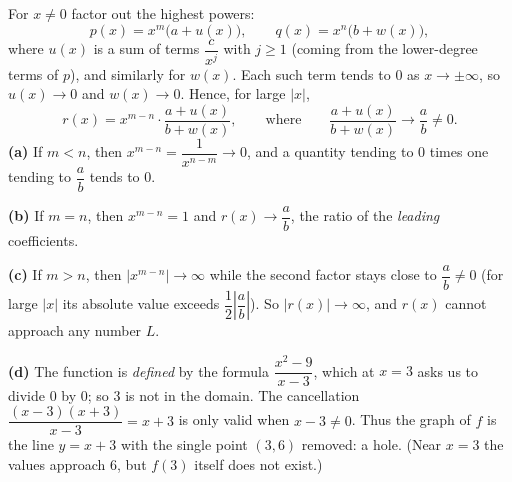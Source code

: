 For $x\ne0$ factor out the highest powers:
\[p(x)=x^m\bigl(a+u(x)\bigr),\qquad q(x)=x^n\bigl(b+w(x)\bigr),\]
where $u(x)$ is a sum of terms $\dfrac{c}{x^j}$ with $j\ge1$ (coming from the lower-degree terms of $p$), and similarly for $w(x)$. Each such term tends to $0$ as $x\to\pm\infty$, so $u(x)\to0$ and $w(x)\to0$. Hence, for large $|x|$,
\[r(x)=x^{m-n}\cdot\dfrac{a+u(x)}{b+w(x)},\qquad\text{where}\qquad\dfrac{a+u(x)}{b+w(x)}\to\dfrac ab\ne0.\]
\textbf{(a)} If $m<n$, then $x^{m-n}=\dfrac1{x^{n-m}}\to0$, and a quantity tending to $0$ times one tending to $\dfrac ab$ tends to $0$.

\textbf{(b)} If $m=n$, then $x^{m-n}=1$ and $r(x)\to\dfrac ab$, the ratio of the \emph{leading} coefficients.

\textbf{(c)} If $m>n$, then $\left|x^{m-n}\right|\to\infty$ while the second factor stays close to $\dfrac ab\ne0$ (for large $|x|$ its absolute value exceeds $\dfrac12\left|\dfrac ab\right|$). So $|r(x)|\to\infty$, and $r(x)$ cannot approach any number $L$.

\textbf{(d)} The function is \emph{defined} by the formula $\dfrac{x^2-9}{x-3}$, which at $x=3$ asks us to divide $0$ by $0$; so $3$ is not in the domain. The cancellation $\dfrac{(x-3)(x+3)}{x-3}=x+3$ is only valid when $x-3\ne0$. Thus the graph of $f$ is the line $y=x+3$ with the single point $(3,6)$ removed: a hole. (Near $x=3$ the values approach $6$, but $f(3)$ itself does not exist.)
